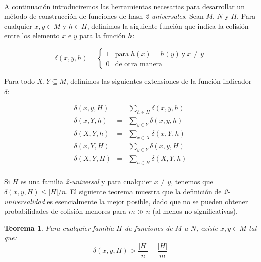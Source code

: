 \documentclass[a4paper,10pt, oneside]{article}
\newtheorem{theorem}{Teorema}[section]
\begin{document}
\

A continuación introduciremos las herramientas necesarias para desarrollar un método de construcción de funciones de hash \textit{2-universales}. Sean $M$, $N$ y $H$. Para cualquier $x,y \in M$ y $h \in H$, definimos la siguiente función que indica la colisión entre los elemento $x$ e $y$ para la función $h$:

\begin{equation}
	\delta(x,y,h) = \left\{
								\begin{array}{ll}

									1 & \text{para} \ h(x) = h(y) \ \text{y} \ x \neq y \\
									0 & \text{de otra manera}
								\end{array}
							\right.
\end{equation}

Para todo $X, Y \subseteq M$, definimos las siguientes extensiones de la función indicador $\delta$:

\begin{equation}
	\begin{array}{lll}
		\delta(x,y,H) & = & \sum\limits_{h \in H} \delta(x,y,h) \\[0.5cm]
		\delta(x,Y,h) & = & \sum\limits_{y \in Y} \delta(x,y,h) \\[0.5cm]
		\delta(X,Y,h) & = & \sum\limits_{x \in X} \delta(x,Y,h) \\[0.5cm]
		\delta(x,Y,H) & = & \sum\limits_{y \in Y} \delta(x,y,H) \\[0.5cm]
		\delta(X,Y,H) & = & \sum\limits_{h \in H} \delta(X,Y,h) \\
	\end{array}
\end{equation}

Si $H$ es una familia \textit{2-universal} y para cualquier $x \neq y$, tenemos que $\delta(x,y,H) \leq |H|/n$.
El siguiente teorema muestra que la definición de \textit{2-universalidad} es esencialmente la mejor posible, dado que no se pueden obtener probabilidades de colisión menores para $m \gg n$ (al menos no significativas).

\begin{theorem}

	Para cualquier familia $H$ de funciones de $M$ a $N$, existe $x, y \in M$ tal que:
	\begin{equation}
		\delta(x,y,H) > \frac{|H|}{n} - \frac{|H|}{m}
	\end{equation}
\end{theorem}
\end{document}
